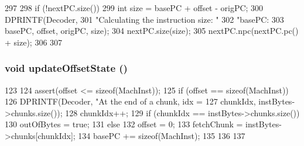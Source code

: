 \begin{DoxyCode}
297     {
298         if (!nextPC.size()) {
299             int size = basePC + offset - origPC;
300             DPRINTF(Decoder,
301                     "Calculating the instruction size: "
302                     "basePC: %
303                     basePC, offset, origPC, size);
304             nextPC.size(size);
305             nextPC.npc(nextPC.pc() + size);
306         }
307     }
\end{DoxyCode}
\hypertarget{classX86ISA_1_1Decoder_a9b25276214b33147c8d3bf84e1aa778c}{
\subsubsection[{updateOffsetState}]{\setlength{\rightskip}{0pt plus 5cm}void updateOffsetState ()}}
\label{classX86ISA_1_1Decoder_a9b25276214b33147c8d3bf84e1aa778c}



\begin{DoxyCode}
123     {
124         assert(offset <= sizeof(MachInst));
125         if (offset == sizeof(MachInst)) {
126             DPRINTF(Decoder, "At the end of a chunk, idx = %
127                     chunkIdx, instBytes->chunks.size());
128             chunkIdx++;
129             if (chunkIdx == instBytes->chunks.size()) {
130                 outOfBytes = true;
131             } else {
132                 offset = 0;
133                 fetchChunk = instBytes->chunks[chunkIdx];
134                 basePC += sizeof(MachInst);
135             }
136         }
137     }
\end{DoxyCode}


